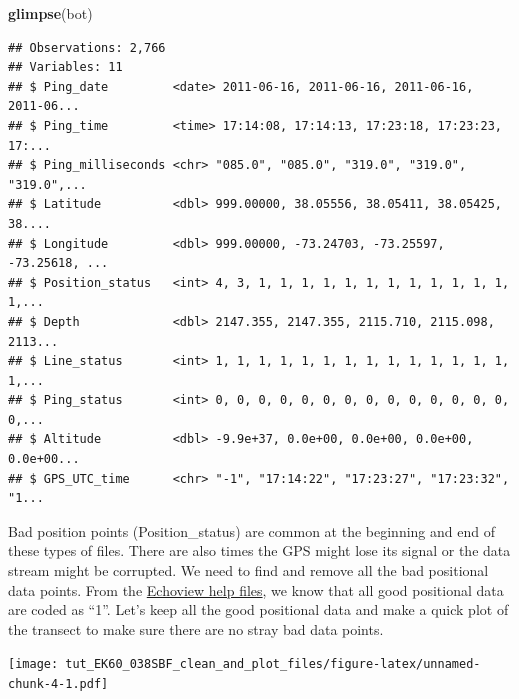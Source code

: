 \documentclass[]{article}
\newenvironment{Shaded}{\begin{snugshade}}{\end{snugshade}}
\newcommand{\DecValTok}[1]{\textcolor[rgb]{0.00,0.00,0.81}{#1}}
\newcommand{\KeywordTok}[1]{\textcolor[rgb]{0.13,0.29,0.53}{\textbf{#1}}}
\newcommand{\NormalTok}[1]{#1}
\newcommand{\OperatorTok}[1]{\textcolor[rgb]{0.81,0.36,0.00}{\textbf{#1}}}
\newcommand{\StringTok}[1]{\textcolor[rgb]{0.31,0.60,0.02}{#1}}
\begin{document}
\begin{Shaded}
\begin{Highlighting}[]
\KeywordTok{glimpse}\NormalTok{(bot)}
\end{Highlighting}
\end{Shaded}

\begin{verbatim}
## Observations: 2,766
## Variables: 11
## $ Ping_date         <date> 2011-06-16, 2011-06-16, 2011-06-16, 2011-06...
## $ Ping_time         <time> 17:14:08, 17:14:13, 17:23:18, 17:23:23, 17:...
## $ Ping_milliseconds <chr> "085.0", "085.0", "319.0", "319.0", "319.0",...
## $ Latitude          <dbl> 999.00000, 38.05556, 38.05411, 38.05425, 38....
## $ Longitude         <dbl> 999.00000, -73.24703, -73.25597, -73.25618, ...
## $ Position_status   <int> 4, 3, 1, 1, 1, 1, 1, 1, 1, 1, 1, 1, 1, 1, 1,...
## $ Depth             <dbl> 2147.355, 2147.355, 2115.710, 2115.098, 2113...
## $ Line_status       <int> 1, 1, 1, 1, 1, 1, 1, 1, 1, 1, 1, 1, 1, 1, 1,...
## $ Ping_status       <int> 0, 0, 0, 0, 0, 0, 0, 0, 0, 0, 0, 0, 0, 0, 0,...
## $ Altitude          <dbl> -9.9e+37, 0.0e+00, 0.0e+00, 0.0e+00, 0.0e+00...
## $ GPS_UTC_time      <chr> "-1", "17:14:22", "17:23:27", "17:23:32", "1...
\end{verbatim}

 Bad position points (Position\_status) are common at the beginning and
end of these types of files. There are also times the GPS might lose its
signal or the data stream might be corrupted. We need to find and remove
all the bad positional data points. From the
\href{https://support.echoview.com/WebHelp/Using_Echoview/Exporting/Exporting_data/Exporting_line_data.htm}{Echoview
help files}, we know that all good positional data are coded as ``1''.
Let's keep all the good positional data and make a quick plot of the
transect to make sure there are no stray bad data points.

\begin{Shaded}
\end{Shaded}

\texttt{[image: tut\_EK60\_038SBF\_clean\_and\_plot\_files/figure-latex/unnamed-chunk-4-1.pdf]}
\end{document}
